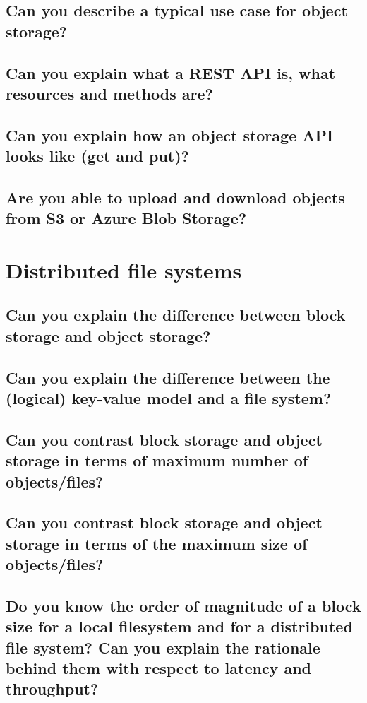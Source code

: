 \documentclass{article}
\begin{document}
\subsection{Can you describe a typical use case for object storage?}
\subsection{Can you explain what a REST API is, what resources and methods are?}
\subsection{Can you explain how an object storage API looks like (get and put)?}
\subsection{Are you able to upload and download objects from S3 or Azure Blob Storage?}

\pagebreak


\section{Distributed file systems}
\subsection{Can you explain the difference between block storage and object storage?}
\subsection{Can you explain the difference between the (logical) key-value model and a file system?}
\subsection{Can you contrast block storage and object storage in terms of maximum number of objects/files?}
\subsection{Can you contrast block storage and object storage in terms of the maximum size of objects/files?}
\subsection{Do you know the order of magnitude of a block size for a local filesystem and for a distributed file system? Can you explain the rationale behind them with respect to latency and throughput?}
\end{document}
